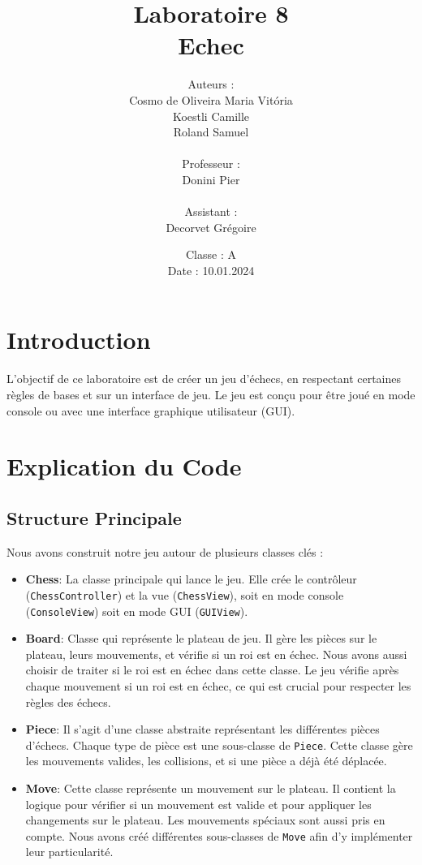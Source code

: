 \documentclass[12pt]{article}
\title{
    \vspace{2cm}
    \Huge{Laboratoire 8} \\
    \Large{Echec}
    \vspace{2cm}
}
\author{
    Auteurs : \\
    Cosmo de Oliveira Maria Vitória \\
    Koestli Camille \\
    Roland Samuel \\
    \\
    Professeur : \\
    Donini Pier \\
    \\
    Assistant : \\
    Decorvet Grégoire
}
\date{
    Classe : A \\
    \vspace{1cm}
    Date : 10.01.2024
}
\begin{document}
    \maketitle

    \thispagestyle{empty} %
    \newpage

    \maketitle

    \section{Introduction}

    L'objectif de ce laboratoire est de créer un jeu d'échecs, en respectant certaines règles de bases et sur un interface de jeu. Le jeu est conçu pour être joué en mode console ou avec une interface graphique utilisateur (GUI).

    \section{Explication du Code}

    \subsection{Structure Principale}

    Nous avons construit notre jeu autour de plusieurs classes clés :

    \begin{itemize}
        \item \textbf{Chess}: La classe principale qui lance le jeu. Elle crée le contrôleur (\texttt{ChessController}) et la vue (\texttt{ChessView}), soit en mode console (\texttt{ConsoleView}) soit en mode GUI (\texttt{GUIView}).
        \item \textbf{Board}: Classe qui représente le plateau de jeu. Il gère les pièces sur le plateau, leurs mouvements, et vérifie si un roi est en échec. Nous avons aussi choisir de traiter si le roi est en échec dans cette classe. Le jeu vérifie après chaque mouvement si un roi est en échec, ce qui est crucial pour respecter les règles des échecs.
        \item \textbf{Piece}: Il s'agit d'une classe abstraite représentant les différentes pièces d'échecs. Chaque type de pièce est une sous-classe de \texttt{Piece}. Cette classe gère les mouvements valides, les collisions, et si une pièce a déjà été déplacée.
        \item \textbf{Move}: Cette classe représente un mouvement sur le plateau. Il contient la logique pour vérifier si un mouvement est valide et pour appliquer les changements sur le plateau. Les mouvements spéciaux sont aussi pris en compte. Nous avons créé différentes sous-classes de \texttt{Move} afin d'y implémenter leur particularité.
    \end{itemize}
\end{document}
